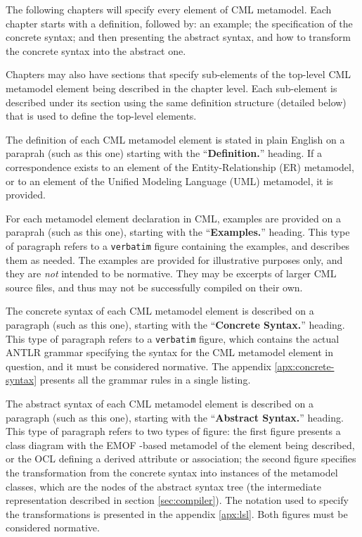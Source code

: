 The following chapters will specify every element of CML metamodel.
Each chapter starts with a definition, followed by: an example;
the specification of the concrete syntax;
and then presenting the abstract syntax,
and how to transform the concrete syntax into the abstract one.

Chapters may also have sections that specify sub-elements
of the top-level CML metamodel element being described in the chapter level.
Each sub-element is described under its section
using the same definition structure (detailed below)
that is used to define the top-level elements.

\begin{definition}
The definition of each CML metamodel element is stated in plain English
on a paraprah (such as this one)
starting with the ``\textbf{Definition.}'' heading.
If a correspondence exists to an element of
the Entity-Relationship (ER) \cite{er} metamodel,
or to an element of the Unified Modeling Language (UML) \cite{uml} metamodel,
it is provided.
\end{definition}

\begin{examples}
For each metamodel element declaration in CML,
examples are provided on a paraprah (such as this one),
starting with the ``\textbf{Examples.}'' heading.
This type of paragraph refers to a \verb+verbatim+ figure
containing the examples, and describes them as needed.
The examples are provided for illustrative purposes only,
and they are \emph{not} intended to be normative.
They may be excerpts of larger CML source files,
and thus may not be successfully compiled on their own.
\end{examples}

\begin{concrete-syntax}
The concrete syntax of each CML metamodel element is described
on a paragraph (such as this one),
starting with the ``\textbf{Concrete Syntax.}'' heading.
This type of paragraph refers to a \verb+verbatim+ figure,
which contains the actual ANTLR \cite{antlr} grammar
specifying the syntax for the CML metamodel element in question,
and it must be considered normative.
The appendix \ref{apx:concrete-syntax} presents all the grammar rules
in a single listing.
\end{concrete-syntax}

\begin{abstract-syntax}
The abstract syntax of each CML metamodel element is described
on a paragraph (such as this one),
starting with the ``\textbf{Abstract Syntax.}'' heading.
This type of paragraph refers to two types of figure:
the first figure presents a class diagram
with the EMOF \cite{mof}-based metamodel
of the element being described,
or the OCL defining a derived attribute or association;
the second figure specifies the transformation
from the concrete syntax into instances of the metamodel classes,
which are the nodes of the abstract syntax tree
(the intermediate representation described in section \ref{sec:compiler}).
The notation used to specify the transformations is presented
in the appendix \ref{apx:lsl}.
Both figures must be considered normative.
\end{abstract-syntax}

